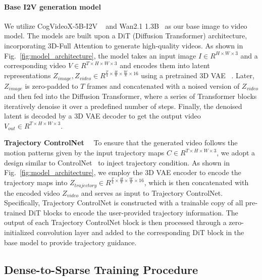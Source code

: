 \paragraph{Base I2V generation model}
We utilize CogVideoX-5B-I2V ~\cite{yang2024cogvideox} and Wan2.1 1.3B~\cite{wan2025} as our base image to video model. The models are built upon a DiT (Diffusion Transformer) architecture, incorporating 3D-Full Attention to generate high-quality videos.
As shown in Fig.~\ref{fig:model_architecture}, the model takes an input image $I \in R^{H \times W \times 3}$ and a corresponding video $V \in R^{T \times H \times W \times 3}$ and encodes them into latent representations $Z_{image},Z_{video} \in R^{\frac{T}{4} \times \frac{H}{8} \times \frac{W}{8} \times 16}$ using a pretrained 3D VAE ~\cite{kingma2013auto}.
Later, $Z_{image}$ is zero-padded to $T$ frames and concatenated with a noised version of $Z_{video}$ and then fed into the Diffusion Transformer, where a series of Transformer blocks iteratively denoise it over a predefined number of steps. 
Finally, the denoised latent is decoded by a 3D VAE decoder to get the output video $V_{out} \in R^{T \times H \times W \times 3}$.

\vspace{0.2cm}
\noindent\textbf{Trajectory ControlNet}
~~To ensure that the generated video follows the motion patterns given by the input trajectory maps $C \in R^{T \times H \times W \times 3}$, we adopt a design similar to ControlNet~\cite{zhang2023adding} to inject trajectory condition. 
As shown in Fig.~\ref{fig:model_architecture}, we employ the 3D VAE encoder to encode the trajectory maps into $Z_{trajectory} \in R^{\frac{T}{4} \times \frac{H}{8} \times \frac{W}{8} \times 16}$, which is then concatenated with the encoded video $Z_{video}$ and serves as input to Trajectory ControlNet.
Specifically, Trajectory ControlNet is constructed with a trainable copy of all pre-trained DiT blocks to encode the user-provided trajectory information. The output of each Trajectory ControlNet block is then processed through a zero-initialized convolution layer and added to the corresponding DiT block in the base model to provide trajectory guidance.

\subsection{Dense-to-Sparse Training Procedure}   
\label{sec:procedure}

